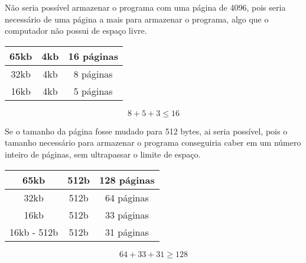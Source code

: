 \begin{question}

     Não seria possível armazenar o programa com uma página de 4096, pois seria 
     necessário de uma página a mais para armazenar o programa, algo que o
     computador não possui de espaço livre. 

     \begin{table}[ht]
     
          \parbox{.45\linewidth}
          {
          \centering 
          \begin{tabular}{|c|c|c|}
               \hline 
               65kb & 4kb & 16 páginas \\ 
               \hline  
               32kb & 4kb & 8 páginas \\ 
               \hline 
               16kb & 4kb & 5 páginas \\ 
               \hline 
          \end{tabular}
          }
          \parbox{.45\linewidth}
          {
          \centering 
          \begin{equation}
               8 + 5 + 3 \leq 16
          \end{equation}
          }
     \end{table}

     Se o tamanho da página fosse mudado
     para 512 bytes, ai seria possível, pois o tamanho necessário para armazenar o 
     programa conseguiria caber em um número inteiro de páginas, sem ultrapassar o limite 
     de espaço.

     \begin{table}[ht]
     
          \parbox{.45\linewidth}
          {
          \centering 
          \begin{tabular}{|c|c|c|}
               \hline 
               65kb & 512b & 128 páginas \\ 
               \hline  
               32kb & 512b & 64 páginas \\ 
               \hline 
               16kb & 512b & 33 páginas \\ 
               \hline 
               16kb - 512b & 512b & 31 páginas \\ 
               \hline 
          \end{tabular}
          }
          \parbox{.45\linewidth}
          {
          \centering 
          \begin{equation}
               64 + 33 + 31 \geq 128
          \end{equation}
          }
     \end{table}

\end{question}
